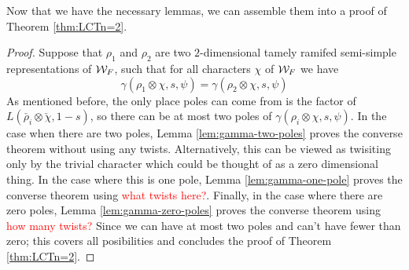 Now that we have the necessary lemmas, we can assemble them into a proof of Theorem \ref{thm:LCTn=2}.
\begin{proof}
  Suppose that $\rho_1$ and $\rho_2$ are two $2$-dimensional tamely ramifed semi-simple representations of $\mathcal{W}_F$, such that for all characters $\chi$ of $\mathcal{W}_F$ we have
  \[\gamma(\rho_1 \otimes \chi,s,\psi) = \gamma(\rho_2 \otimes \chi, s, \psi)\]
  As mentioned before, the only place poles can come from is the factor of $L(\check{\rho_i} \otimes \check{\chi},1-s)$, so there can be at most two poles of $\gamma(\rho_i \otimes \chi, s, \psi)$.
  In the case when there are two poles, Lemma \ref{lem:gamma-two-poles} proves the converse theorem without using any twists.
  Alternatively, this can be viewed as twisiting only by the trivial character which could be thought of as a zero dimensional thing.
  In the case where this is one pole, Lemma \ref{lem:gamma-one-pole} proves the converse theorem using \textcolor{red}{what twists here?}.
  Finally, in the case where there are zero poles, Lemma \ref{lem:gamma-zero-poles} proves the converse theorem using \textcolor{red}{how many twists?}
  Since we can have at most two poles and can't have fewer than zero; this covers all posibilities and concludes the proof of Theorem \ref{thm:LCTn=2}.
\end{proof}

\endinput
